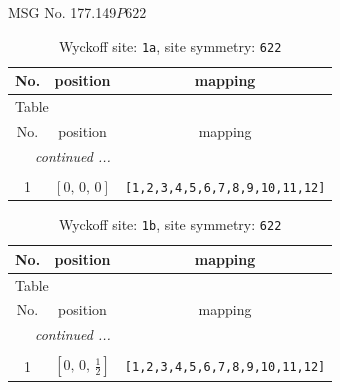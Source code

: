 \documentclass[fleqn,8pt]{jsarticle}
\begin{document}
\setcounter{MaxMatrixCols}{32}

\renewcommand{\tablename}{Table~}
\renewcommand{\figurename}{Figure~}
\begin{center}
\LARGE
MSG No. 177.149\quad$P622$
\end{center}
\renewcommand{\arraystretch}{1.2}
\begin{longtable}{ccc}
\caption{Wyckoff site: {\tt 1a}, site symmetry: {\tt 622}}
 \\
 \hline \hline
No. & position & mapping \\ \hline \endfirsthead

\multicolumn{2}{l}{\tablename\ \thetable{}} \\
 \hline \hline
No. & position & mapping \\ \hline \endhead

 \hline \hline
\multicolumn{2}{r}{\footnotesize\it continued ...} \\ \endfoot

 \hline \hline
\multicolumn{2}{r}{} \\ \endlastfoot

1 & $\left[ 0,\, 0,\, 0 \right]$ & {\tt [1,2,3,4,5,6,7,8,9,10,11,12]} \\
\end{longtable}
\renewcommand{\arraystretch}{1.2}
\begin{longtable}{ccc}
\caption{Wyckoff site: {\tt 1b}, site symmetry: {\tt 622}}
 \\
 \hline \hline
No. & position & mapping \\ \hline \endfirsthead

\multicolumn{2}{l}{\tablename\ \thetable{}} \\
 \hline \hline
No. & position & mapping \\ \hline \endhead

 \hline \hline
\multicolumn{2}{r}{\footnotesize\it continued ...} \\ \endfoot

 \hline \hline
\multicolumn{2}{r}{} \\ \endlastfoot

1 & $\left[ 0,\, 0,\, \frac{1}{2} \right]$ & {\tt [1,2,3,4,5,6,7,8,9,10,11,12]} \\
\end{longtable}
\renewcommand{\arraystretch}{1.2}
\end{document}
